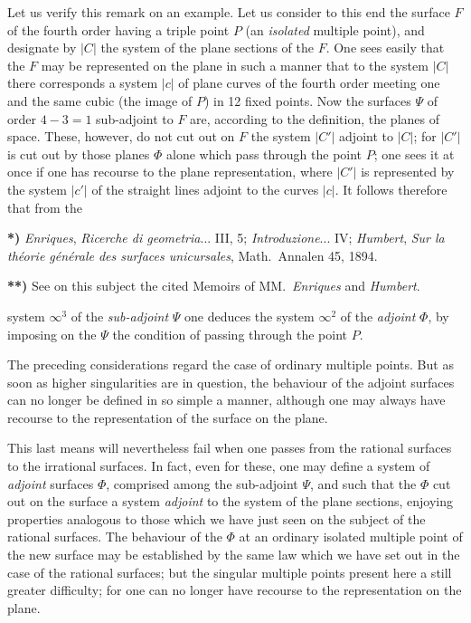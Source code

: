 \documentclass{article}
\begin{document}
Let us verify this remark on an example. Let us consider to this end the surface $F$ of the fourth order having a triple point $P$ (an \emph{isolated} multiple point), and designate by $|C|$ the system of the plane sections of the $F$. One sees easily that the $F$ may be represented on the plane in such a manner that to the system $|C|$ there corresponds a system $|c|$ of plane curves of the fourth order meeting one and the same cubic (the image of $P$) in 12 fixed points. Now the surfaces $\Psi$ of order $4-3=1$ sub-adjoint to $F$ are, according to the definition, the planes of space. These, however, do not cut out on $F$ the system $|C'|$ adjoint to $|C|$; for $|C'|$ is cut out by those planes $\Phi$ alone which pass through the point $P$; one sees it at once if one has recourse to the plane representation, where $|C'|$ is represented by the system $|c'|$ of the straight lines adjoint to the curves $|c|$. It follows therefore that from the

\textbf{*)} \emph{Enriques}, \emph{Ricerche di geometria}... III, 5; \emph{Introduzione}... IV; \emph{Humbert}, \emph{Sur la théorie générale des surfaces unicursales}, Math.\ Annalen 45, 1894.

\textbf{**)} See on this subject the cited Memoirs of MM.\ \emph{Enriques} and \emph{Humbert}.

system $\infty^{3}$ of the \emph{sub-adjoint} $\Psi$ one deduces the system $\infty^{2}$ of the \emph{adjoint} $\Phi$, by imposing on the $\Psi$ the condition of passing through the point $P$.

The preceding considerations regard the case of ordinary multiple points. But as soon as higher singularities are in question, the behaviour of the adjoint surfaces can no longer be defined in so simple a manner, although one may always have recourse to the representation of the surface on the plane.

This last means will nevertheless fail when one passes from the rational surfaces to the irrational surfaces. In fact, even for these, one may define a system of \emph{adjoint} surfaces $\Phi$, comprised among the sub-adjoint $\Psi$, and such that the $\Phi$ cut out on the surface a system \emph{adjoint} to the system of the plane sections, enjoying properties analogous to those which we have just seen on the subject of the rational surfaces. The behaviour of the $\Phi$ at an ordinary isolated multiple point of the new surface may be established by the same law which we have set out in the case of the rational surfaces; but the singular multiple points present here a still greater difficulty; for one can no longer have recourse to the representation on the plane.
\end{document}
